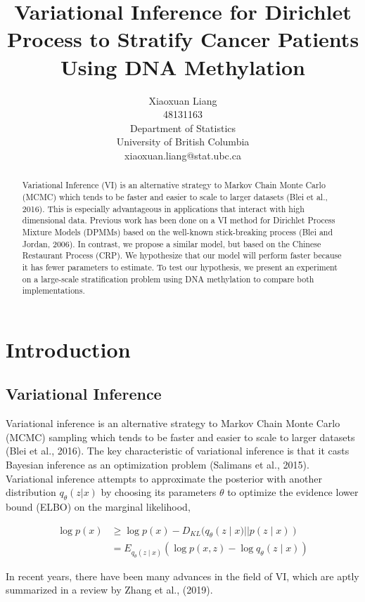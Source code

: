 \documentclass{article}
\title{Variational Inference for Dirichlet Process to Stratify Cancer
Patients Using DNA Methylation}
\author{
  Xiaoxuan Liang \\
  48131163\\
  Department of Statistics\\
  University of British Columbia\\
  xiaoxuan.liang@stat.ubc.ca
  }
\def\cond{\; | \;}
\begin{document}
\maketitle

\begin{abstract}
Variational Inference (VI) is an alternative strategy to Markov Chain Monte Carlo (MCMC) which tends to be faster and easier to scale to larger datasets (Blei et al., 2016). This is especially advantageous in applications that interact with high dimensional data. Previous work has been done on a VI method for Dirichlet Process Mixture Models (DPMMs) based on the well-known stick-breaking process (Blei and Jordan, 2006). In contrast, we propose a similar model, but based on the Chinese Restaurant Process (CRP). We hypothesize that our model will perform faster because it has fewer parameters to estimate. To test our hypothesis, we present an experiment on a large-scale stratification problem using DNA methylation to compare both implementations.
\end{abstract}

\section{Introduction}

\subsection{Variational Inference}

Variational inference is an alternative strategy to Markov Chain Monte Carlo (MCMC) sampling which tends to be faster and easier to scale to larger datasets (Blei et al., 2016). The key characteristic of variational inference is that it casts Bayesian inference as an optimization problem (Salimans et al., 2015). Variational inference attempts to approximate the posterior with another distribution $q_\theta(z|x)$ by choosing its parameters $\theta$ to optimize the evidence lower bound (ELBO) on the marginal likelihood,

\begin{align*}
\log{p(x)} &\geq \log p(x) - D_{KL}(q_\theta(z\cond x)||p(z\cond x))\\
		   &= E_{q_\theta(z\cond x)}(\log p(x,z)-\log q_\theta (z\cond x))
\end{align*}

In recent years, there have been many advances in the field of VI, which are aptly summarized in a review by Zhang et al., (2019).
\end{document}
